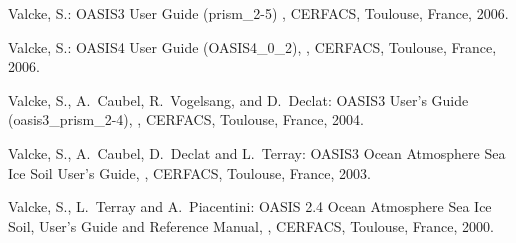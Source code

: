 \begin{thebibliography}{10}
Valcke, S.: 
\newblock OASIS3 User Guide (prism\_2-5) 
, 
\newblock CERFACS, Toulouse, France, 2006. 

Valcke, S.: 
\newblock OASIS4 User Guide (OASIS4\_0\_2), 
, 
\newblock CERFACS, Toulouse, France, 2006. 

Valcke, S., A.~Caubel, R.~Vogelsang, and D.~Declat:       
\newblock OASIS3 User's Guide (oasis3\_prism\_2-4),
, 
\newblock CERFACS, Toulouse, France, 2004.

Valcke, S., A.~Caubel, D.~Declat and L.~Terray:        
\newblock OASIS3 Ocean Atmosphere Sea Ice Soil User's Guide,
, 
\newblock CERFACS, Toulouse, France, 2003.

Valcke, S., L.~Terray and A.~Piacentini:
\newblock OASIS 2.4 Ocean Atmosphere Sea Ice Soil, User's Guide and
Reference Manual,
, 
\newblock CERFACS, Toulouse, France, 2000.

\end{thebibliography}
